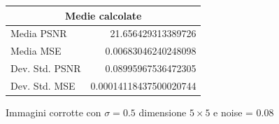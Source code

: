 \begin{figure}[H]
\begin{minipage}[h]{0.4\textwidth}
{\begin{tabular}{|lr|}
            \multicolumn{2}{|c|}{\textbf{Medie calcolate}} \\ \hline
            Media PSNR           & 21.656429313389726           \\
            Media MSE            & 0.00683046240248098       \\
            Dev. Std. PSNR       & 0.08995967536472305           \\
            Dev. Std. MSE        & 0.00014118437500020744      \\ \hline
            \end{tabular}
        }
    \end{minipage}
    \captionsetup{labelformat=andtable}
    \caption{Immagini corrotte con $\sigma = 0.5$ dimensione $5 \times 5$ e noise = 0.08}
\end{figure}

